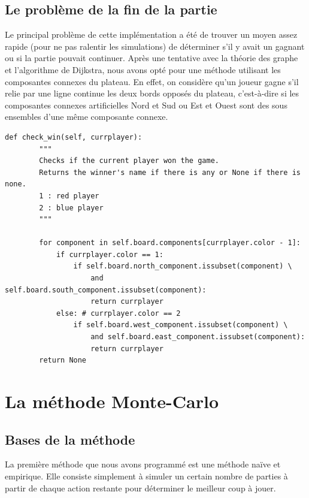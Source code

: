 \documentclass[a4paper]{article}
\theoremstyle{definition}
\begin{document}
\subsection{Le problème de la fin de la partie}

Le principal problème de cette implémentation a été de trouver un moyen assez rapide (pour ne pas ralentir les simulations) de déterminer s'il y avait un gagnant ou si la partie pouvait continuer. Après une tentative avec la théorie des graphe et l'algorithme de Dijkstra, nous avons opté pour une méthode utilisant les composantes connexes du plateau. En effet, on considère qu'un joueur gagne s'il relie par une ligne continue les deux bords opposés du plateau, c'est-à-dire si les composantes connexes artificielles Nord et Sud ou Est et Ouest sont des sous ensembles d'une même composante connexe. 

\begin{lstlisting}
def check_win(self, currplayer):
        """
        Checks if the current player won the game. 
        Returns the winner's name if there is any or None if there is none.
        1 : red player
        2 : blue player
        """

        for component in self.board.components[currplayer.color - 1]:
            if currplayer.color == 1:
                if self.board.north_component.issubset(component) \
                    and self.board.south_component.issubset(component):
                    return currplayer
            else: # currplayer.color == 2
                if self.board.west_component.issubset(component) \
                    and self.board.east_component.issubset(component):
                    return currplayer
        return None
\end{lstlisting}


\clearpage

\section{La méthode Monte-Carlo}

\subsection{Bases de la méthode}

La première méthode que nous avons programmé est une méthode naïve et empirique. Elle consiste simplement à simuler un certain nombre de parties à partir de chaque action restante pour déterminer le meilleur coup à jouer.
\end{document}
